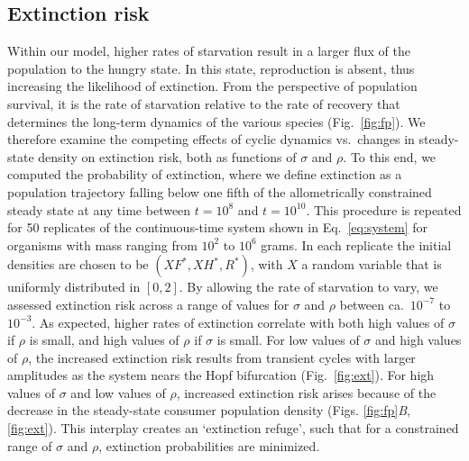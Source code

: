 \documentclass[twocolumn,preprintnumbers,amsmath,amssymb,superscriptaddress]{revtex4}
\begin{document}
\begin{bibunit}[unsrt]
\section*{Extinction risk}
Within our model, higher rates of starvation result in a larger flux of the population to the hungry state.
In this state, reproduction is absent, thus increasing the likelihood of extinction.  From the perspective of population survival, it is the rate of starvation relative to the rate of recovery that determines the long-term dynamics of the various species (Fig.~\ref{fig:fp}).
We therefore examine the competing effects of cyclic dynamics vs.\ changes in steady-state density on extinction risk, both as functions of $\sigma$ and $\rho$.
To this end, we computed the probability of extinction, where we define extinction as a population trajectory falling below one fifth of the allometrically constrained steady state at any time between $t=10^8$ and $t=10^{10}$.
This procedure is repeated for 50 replicates of the continuous-time system shown in Eq.~\ref{eq:system} for organisms with mass ranging from $10^2$ to $10^6$ grams.
In each replicate the initial densities are chosen to be $(XF^*,XH^*,R^*)$, with $X$ a random variable that is uniformly distributed in $[0,2]$.
By allowing the rate of starvation to vary, we assessed extinction risk across a range of values for $\sigma$ and $\rho$ between ca.\ $10^{-7}$ to $10^{-3}$. %
As expected, higher rates of extinction correlate with both high values of $\sigma$ if $\rho$ is small, and high values of $\rho$ if $\sigma$ is small.
For low values of $\sigma$ and high values of $\rho$, the increased extinction risk results from transient cycles with larger amplitudes as the system nears the Hopf bifurcation (Fig.~\ref{fig:ext}).
For high values of $\sigma$ and low values of $\rho$, increased extinction risk arises because of the decrease in the steady-state consumer population density (Figs. \ref{fig:fp}\emph{B}, \ref{fig:ext}).
This interplay creates an `extinction refuge', such that for a constrained range of $\sigma$ and $\rho$, extinction probabilities are minimized.




\end{bibunit}
\end{document}
